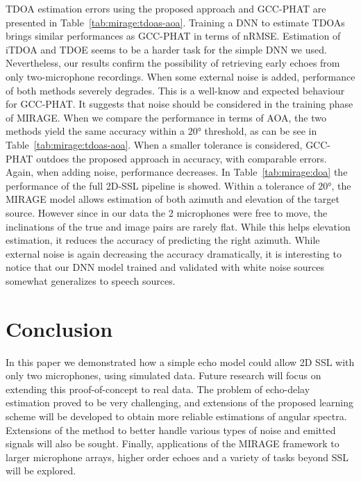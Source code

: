 TDOA estimation errors using the proposed approach and GCC-PHAT are presented in Table~\cref{tab:mirage:tdoas-aoa}.
Training a DNN to estimate TDOAs brings similar performances as GCC-PHAT in terms of nRMSE.
Estimation of iTDOA and TDOE seems to be a harder task for the simple DNN we used.
Nevertheless, our results confirm the possibility of retrieving early echoes from only two-microphone recordings.
When some external noise is added, performance of both methods severely degrades.
This is a well-know and expected behaviour for GCC-PHAT.
It suggests that noise should be considered in the training phase of MIRAGE.
When we compare the performance in terms of AOA, the two methods yield the same accuracy within a $\ang{20}$ threshold, as can be see in Table~\cref{tab:mirage:tdoas-aoa}.
When a smaller tolerance is considered, GCC-PHAT outdoes the proposed approach in accuracy, with comparable errors.
Again, when adding noise, performance decreases.
In Table~\cref{tab:mirage:doa} the performance of the full 2D-SSL pipeline is showed.
Within a tolerance of $\ang{20}$, the MIRAGE model allows estimation of both azimuth and elevation of the target source.
However since in our data the 2 microphones were free to move, the inclinations of the true and image pairs are rarely flat.
While this helps elevation estimation, it reduces the accuracy of predicting the right azimuth.
While external noise is again decreasing the accuracy dramatically,
it is interesting to notice that our DNN model trained and validated with white noise sources somewhat generalizes to speech sources.

\section{Conclusion}
In this paper we demonstrated how a simple echo model could allow 2D SSL with only two microphones, using simulated data.
Future research will focus on extending this proof-of-concept to real data.
The problem of echo-delay estimation proved to be very challenging, and extensions of the proposed learning scheme will be developed to obtain more reliable estimations of angular spectra.
Extensions of the method to better handle various types of noise and emitted signals will also be sought.
Finally, applications of the MIRAGE framework to larger microphone arrays, higher order echoes and a variety of tasks beyond SSL will be explored.
